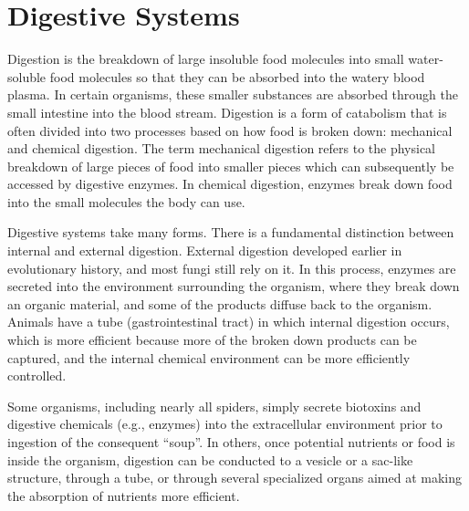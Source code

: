 \hypertarget{digestive-systems}{%
\chapter{Digestive Systems}\label{digestive-systems}}

Digestion is the breakdown of large insoluble food molecules into small water-soluble food molecules so that they can be absorbed into the watery blood plasma. In certain organisms, these smaller substances are absorbed through the small intestine into the blood stream. Digestion is a form of catabolism that is often divided into two processes based on how food is broken down: mechanical and chemical digestion. The term mechanical digestion refers to the physical breakdown of large pieces of food into smaller pieces which can subsequently be accessed by digestive enzymes. In chemical digestion, enzymes break down food into the small molecules the body can use.

Digestive systems take many forms. There is a fundamental distinction between internal and external digestion. External digestion developed earlier in evolutionary history, and most fungi still rely on it. In this process, enzymes are secreted into the environment surrounding the organism, where they break down an organic material, and some of the products diffuse back to the organism. Animals have a tube (gastrointestinal tract) in which internal digestion occurs, which is more efficient because more of the broken down products can be captured, and the internal chemical environment can be more efficiently controlled.

Some organisms, including nearly all spiders, simply secrete biotoxins and digestive chemicals (e.g., enzymes) into the extracellular environment prior to ingestion of the consequent ``soup''. In others, once potential nutrients or food is inside the organism, digestion can be conducted to a vesicle or a sac-like structure, through a tube, or through several specialized organs aimed at making the absorption of nutrients more efficient.

